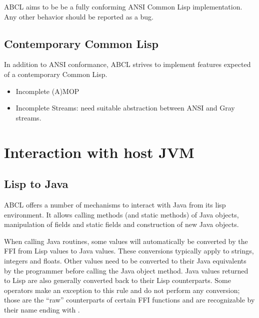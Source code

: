 \documentclass[10pt]{book}
\begin{document}
ABCL aims to be be a fully conforming ANSI Common Lisp
implementation.  Any other behavior should be reported as a bug.

\section{Contemporary Common Lisp}
In addition to ANSI conformance, ABCL strives to implement features
expected of a contemporary Common Lisp.
\begin{itemize}
  \item Incomplete (A)MOP 
  \item Incomplete Streams:  need suitable abstraction between ANSI
    and Gray streams.
    
\end{itemize}

\chapter{Interaction with host JVM}


\section{Lisp to Java}

ABCL offers a number of mechanisms to interact with Java from
its lisp environment. It allows calling methods (and static methods) of
Java objects, manipulation of fields and static fields and construction
of new Java objects.

When calling Java routines, some values will automatically be converted
by the FFI from Lisp values to Java values. These conversions typically
apply to strings, integers and floats. Other values need to be converted
to their Java equivalents by the programmer before calling the Java
object method. Java values returned to Lisp are also generally converted
back to their Lisp counterparts. Some operators make an exception to this
rule and do not perform any conversion; those are the ``raw'' counterparts
of certain FFI functions and are recognizable by their name ending with
.
\end{document}
